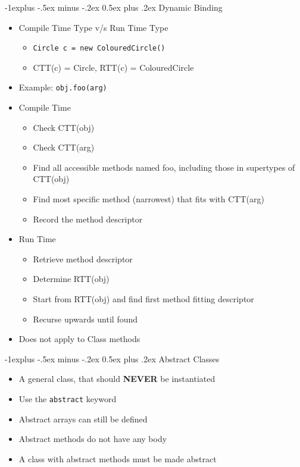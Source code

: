 \documentclass[10pt, landscape]{article}
\makeatletter
\renewcommand{\section}{\@startsection{section}{1}{0mm}%
                                {-1ex plus -.5ex minus -.2ex}%
                                {0.5ex plus .2ex}%
                                {\normalfont\large\bfseries}}
\renewcommand{\section}{\@startsection{section}{2}{0mm}%
                                {-1explus -.5ex minus -.2ex}%
                                {0.5ex plus .2ex}%
                                {\normalfont\normalsize\bfseries}}
\makeatother
\begin{document}
\begin{multicols*}{4}
\section{Dynamic Binding}
\begin{itemize}
    \item Compile Time Type v/s Run Time Type
    \begin{itemize}
        \item \lstinline{Circle c = new ColouredCircle()}
        \item CTT(c) = Circle, RTT(c) = ColouredCircle
    \end{itemize}
    \item Example: \lstinline{obj.foo(arg)}
    \item Compile Time
    \begin{itemize}
        \item Check CTT(obj)
        \item Check CTT(arg)
        \item Find all accessible methods named foo, including those in supertypes of CTT(obj)
        \item Find most specific method (narrowest) that fits with CTT(arg)
        \item Record the method descriptor
    \end{itemize}
    \item Run Time
    \begin{itemize}
        \item Retrieve method descriptor
        \item Determine RTT(obj)
        \item Start from RTT(obj) and find first method fitting descriptor
        \item Recurse upwards until found
    \end{itemize}
    \item Does not apply to Class methods
\end{itemize}

\section{Abstract Classes}
\begin{itemize}
    \item A general class, that should \textbf{NEVER} be instantiated
    \item Use the \lstinline{abstract} keyword
    \item Abstract arrays can still be defined
    \item Abstract methods do not have any body
    \item A class with abstract methods must be made abstract
\end{itemize}


\end{multicols*}
\end{document}

